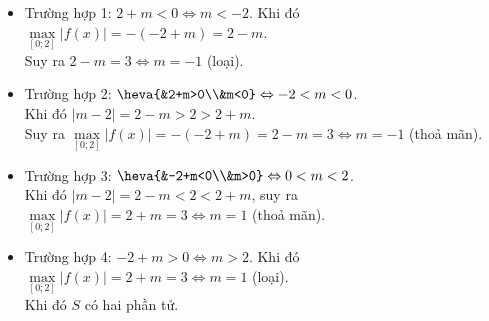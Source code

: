 \begin{ex}
{\begin{itemchoice}
\begin{center}
			\end{center}
			\begin{itemize}
				 \item Trường hợp 1: $2+m<0\Leftrightarrow m<-2$. Khi đó $\max\limits_{[0;2]}|f(x)|=-(-2+m)=2-m$.\\
				Suy ra $2-m=3\Leftrightarrow  m=-1$ (loại).
				\item  Trường hợp 2: $\heva{&2+m>0\\&m<0}\Leftrightarrow -2<m<0$.\\
				Khi đó  $|m-2|=2-m>2>2+m$.\\
				 Suy ra $\max\limits_{[0;2]}|f(x)|=-(-2+m)=2-m=3\Leftrightarrow m=-1$ (thoả mãn).
				\item Trường hợp 3: $\heva{&-2+m<0\\&m>0}\Leftrightarrow 0<m<2$.\\ 
				Khi đó $|m-2|=2-m<2<2+m$, suy ra $\max\limits_{[0;2]}|f(x)|=2+m=3\Leftrightarrow m=1$  (thoả mãn).
				\item Trường hợp 4: $-2+m>0\Leftrightarrow m>2$. Khi đó $\max\limits_{[0;2]}|f(x)|=2+m=3\Leftrightarrow m=1$ (loại).\\ 
				 Khi đó $S$ có hai phần tử.
			\end{itemize}
		\end{itemchoice}
	} 
\end{ex}

